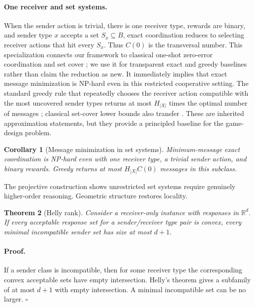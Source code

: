 \documentclass[letterpaper]{article} %
\newtheorem{theorem}{Theorem}
\newtheorem{corollary}[theorem]{Corollary}
\begin{document}
\paragraph{One receiver and set systems.}
When the sender action is trivial, there is one receiver type, rewards are
binary, and sender type $x$ accepts a set $S_x\subseteq B$, exact coordination
reduces to selecting receiver actions that hit every $S_x$. Thus
$C(0)$ is the transversal number. This specialization connects our framework
to classical one-shot zero-error coordination and set cover
\citep{mceliece1971hide,abroshan2015zero,chvatal1979greedy,feige1998threshold};
we use it for transparent exact and greedy baselines rather than claim the
reduction as new. It immediately implies that exact message minimization is
NP-hard even in this restricted cooperative setting. The standard greedy rule
that repeatedly chooses the receiver action compatible with the most uncovered
sender types returns at most $H_{|X|}$ times the optimal number of messages
\citep{chvatal1979greedy}; classical set-cover lower bounds also transfer
\citep{feige1998threshold}. These are inherited approximation statements, but
they provide a principled baseline for the game-design problem.

\begin{corollary}[Message minimization in set systems]\label{cor:setcover}
Minimum-message exact coordination is NP-hard even with one receiver type, a
trivial sender action, and binary rewards. Greedy returns at most
$H_{|X|}C(0)$ messages in this subclass.
\end{corollary}

The projective construction shows unrestricted set systems require genuinely
higher-order reasoning. Geometric structure restores locality.

\begin{theorem}[Helly rank]\label{thm:helly}
Consider a receiver-only instance with responses in $\mathbb{R}^d$. If every
acceptable response set for a sender/receiver type pair is convex, every
minimal incompatible sender set has size at most $d+1$.
\end{theorem}

\paragraph{Proof.}
If a sender class is incompatible, then for some receiver type the corresponding
convex acceptable sets have empty intersection. Helly's theorem gives a
subfamily of at most $d+1$ with empty intersection. A minimal incompatible set
can be no larger. \hfill$\square$
\end{document}

